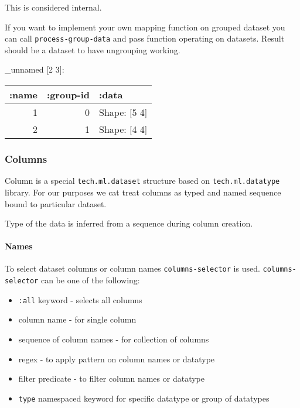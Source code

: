 \documentclass[]{article}
\newenvironment{Shaded}{\begin{snugshade}}{\end{snugshade}}
\newcommand{\KeywordTok}[1]{\textcolor[rgb]{0.13,0.29,0.53}{\textbf{#1}}}
\newcommand{\StringTok}[1]{\textcolor[rgb]{0.31,0.60,0.02}{#1}}
\newcommand{\VariableTok}[1]{\textcolor[rgb]{0.00,0.00,0.00}{#1}}
\newcommand{\AttributeTok}[1]{\textcolor[rgb]{0.77,0.63,0.00}{#1}}
\newcommand{\NormalTok}[1]{#1}
\providecommand{\tightlist}{%
  \setlength{\itemsep}{0pt}\setlength{\parskip}{0pt}}
\let\oldparagraph\paragraph
\renewcommand{\paragraph}[1]{\oldparagraph{#1}\mbox{}}
\begin{document}
This is considered internal.

If you want to implement your own mapping function on grouped dataset
you can call \texttt{process-group-data} and pass function operating on
datasets. Result should be a dataset to have ungrouping working.

\begin{Shaded}
\end{Shaded}

\_unnamed {[}2 3{]}:

\begin{longtable}[]{@{}rrl@{}}
\toprule
:name & :group-id & :data\tabularnewline
\midrule
\endhead
1 & 0 & Shape: {[}5 4{]}\tabularnewline
2 & 1 & Shape: {[}4 4{]}\tabularnewline
\bottomrule
\end{longtable}

\subsubsection{Columns}\label{columns}

Column is a special \texttt{tech.ml.dataset} structure based on
\texttt{tech.ml.datatype} library. For our purposes we cat treat columns
as typed and named sequence bound to particular dataset.

Type of the data is inferred from a sequence during column creation.

\paragraph{Names}\label{names}

To select dataset columns or column names \texttt{columns-selector} is
used. \texttt{columns-selector} can be one of the following:

\begin{itemize}
\tightlist
\item
  \texttt{:all} keyword - selects all columns
\item
  column name - for single column
\item
  sequence of column names - for collection of columns
\item
  regex - to apply pattern on column names or datatype
\item
  filter predicate - to filter column names or datatype
\item
  \texttt{type} namespaced keyword for specific datatype or group of
  datatypes
\end{itemize}
\end{document}
